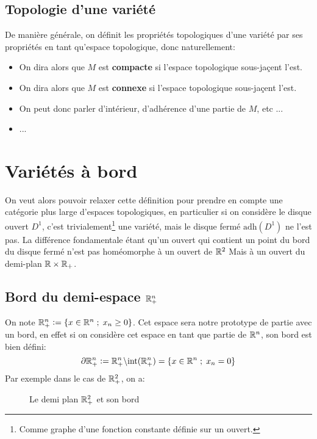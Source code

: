    \section{Topologie d'une variété}
   De manière générale, on définit les propriétés topologiques d'une variété par ses propriétés en tant qu'espace topologique, donc naturellement:
      \begin{itemize}
         \item On dira alors que \( M \) est \textbf{compacte} si l'espace topologique sous-jaçent l'est.
         \item On dira alors que \( M \) est \textbf{connexe} si l'espace topologique sous-jaçent l'est.
         \item On peut donc parler d'intérieur, d'adhérence d'une partie de \( M \), etc ...
         \item ...
      \end{itemize}
\chapter{Variétés à bord}
   On veut alors pouvoir relaxer cette définition pour prendre en compte une catégorie plus large d'espaces topologiques, en particulier si on considère le disque ouvert \( D^1 \), c'est trivialement\footnote[1]{Comme graphe d'une fonction constante définie sur un ouvert.} une variété, mais le disque fermé \( \text{adh}(D^1) \) ne l'est pas. La différence fondamentale étant qu'un ouvert qui contient un point du bord du disque fermé n'est pas homéomorphe à un ouvert de \( \mathbb{R}^2 \) Mais à un ouvert du demi-plan \( \mathbb{R} \times \mathbb{R}_+ \).

   \section{Bord du demi-espace \( \mathbb{R}^n_+ \)}
   On note \( \mathbb{R}^n_+ := \left\{ x \in \mathbb{R}^n  \; ; \; x_n \geq 0\right\} \). Cet espace sera notre prototype de partie avec un bord, en effet si on considère cet espace en tant que partie de \( \mathbb{R}^n \), son bord est bien défini:
   \[ 
      \partial \mathbb{R}^n_+ := \mathbb{R}^n_+ \backslash \text{int}(\mathbb{R}^n_+) = \left\{ x \in \mathbb{R}^n \; ; \; x_n = 0\right\}  
   \]
   Par exemple dans le cas de \( \mathbb{R}^2_+ \), on a:
      \begin{figure}[ht!]
         \centering
        \caption{Le demi plan \( \mathbb{R}^2_+ \) et son bord}
      \end{figure}
   \vspace{-15pt}
